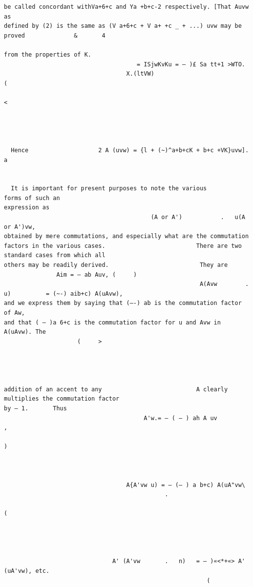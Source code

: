 \documentclass[10pt]{article}
\begin{document}
\begin{verbatim}
be called concordant withVa+6+c and Ya +b+c-2 respectively. [That Auvw as
defined by (2) is the same as (V a+6+c + V a+ +c _ + ...) uvw may be proved              &       4

from the properties of K.
                                      = ISjwKvKu = — )£ Sa tt+1 >WTO.
                                   X.(ltVW)                                  (
                                                                                                 <




  Hence                    2 A (uvw) = {l + (~)^a+b+cK + b+c +VK}uvw].               a


  It is important for present purposes to note the various                                                        forms of such an
expression as
                                          (A or A')           .   u(A or A')vw,
obtained by mere commutations, and especially what are the commutation
factors in the various cases.                          There are two standard cases from which all
others may be readily derived.                          They are
               Aim = — ab Auv, (     )
                                                        A(Avw        .   u)          = (~-) aib+c) A(uAvw),
and we express them by saying that (—-) ab is the commutation factor of Aw,
and that ( — )a 6+c is the commutation factor for u and Avw in A(uAvw). The
                     (     >




addition of an accent to any                           A clearly multiplies the commutation factor
by — 1.       Thus
                                        A'w.= — ( — ) ah A uv                    ,
                                                                                             )



                                   A{A'vw u) = — (— ) a b+c) A(uA"vw\
                                              .
                                                                         (




                               A' (A'vw       .   n)   = — )«<*+«> A' (uA'vw), etc.
                                                          (


\end{verbatim}
\clearpage
\end{document}
